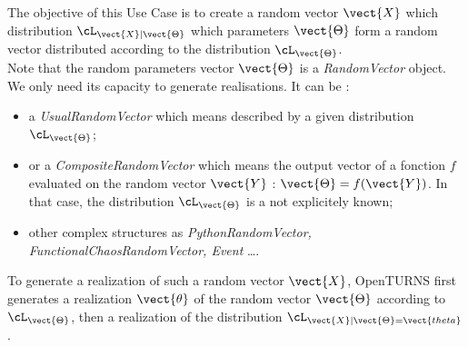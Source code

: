 \renewcommand{\filename}{docUC_InputBayesian.tex}
\renewcommand{\filetitle}{UC : Creation of a random vector with random parameters}

\HeaderIIILevel




The objective of this Use Case is to create a random vector $\vect{X}$ which distribution $\cL_{\vect{X}|\vect{\Theta}}$ which parameters $\vect{\Theta}$ form a random vector distributed according to the distribution  $\cL_{\vect{\Theta}}$.\\

Note that the random parameters vector $\vect{\Theta}$ is a {\itshape RandomVector} object. We only need its capacity to generate realisations.  It can be :
\begin{itemize}
\item a {\itshape UsualRandomVector} which means described by a given distribution $\cL_{\vect{\Theta}}$;
\item or a {\itshape CompositeRandomVector} which means the output vector of a fonction $f$ evaluated on the random vector $\vect{Y}$  : $\vect{\Theta} = f(\vect{Y})$. In that case, the distribution $\cL_{\vect{\Theta}}$ is a not explicitely known;
\item other complex structures as {\itshape PythonRandomVector, FunctionalChaosRandomVector, Event} \dots.
\end{itemize}

To generate a realization of such a random vector $\vect{X}$, OpenTURNS first generates a realization $\vect{\theta}$  of the random vector  $\vect{\Theta}$ according to  $\cL_{\vect{\Theta}}$, then a realization of the distribution $\cL_{\vect{X}|\vect{\Theta}=\vect{theta}}$.\\


